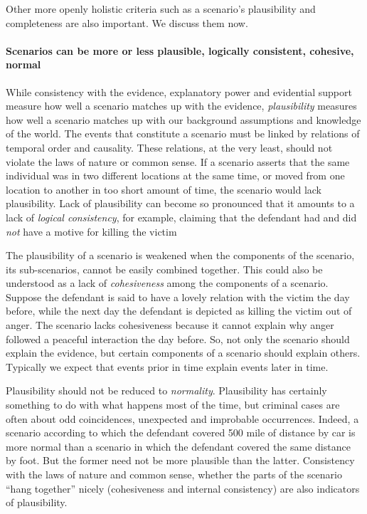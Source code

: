 \documentclass[10pt]{article}
\begin{document}
 
Other more openly holistic criteria such as a scenario's plausibility and completeness are also important. 
 We discuss them now.
  
\paragraph{Scenarios can be more or less plausible, logically consistent, cohesive, normal}

While consistency with the evidence, explanatory power and evidential support measure how well a 
scenario matches up with the evidence, \textit{plausibility} measures how well a scenario matches up with 
our background assumptions and knowledge of the world. The events that constitute a scenario must be linked 
by relations of temporal order and causality. These relations, at the very least, should not violate the laws of nature 
or common sense. If a scenario asserts that the same individual was in two different locations 
at the same time, or moved from one location to another in too short amount of time, the scenario would lack plausibility.  
Lack of plausibility can become so pronounced that it amounts to a lack of \textit{logical consistency}, for example, claiming that 
 the defendant had and did \textit{not} have a motive for killing the victim

The plausibility of a scenario is weakened when the components of the scenario, its
sub-scenarios, cannot be easily combined together. This could also be understood as 
a lack of \textit{cohesiveness} among the components of a scenario. Suppose the defendant is said to have a lovely relation with 
the victim the day before, while the next day the defendant is depicted as killing the victim out of anger.
The scenario lacks cohesiveness because it cannot explain why anger followed a peaceful 
interaction the day before. So, not only the scenario should explain the evidence, but certain
 components of a scenario should explain others. Typically we expect that events prior in time 
 explain events later in time. 
 
 Plausibility should not be reduced to \textit{normality}. Plausibility has certainly something to do with 
what happens most of the time, but criminal cases are often about odd coincidences, 
unexpected and improbable occurrences.  Indeed, a scenario according to which the defendant covered 500 mile of distance by car is more normal than a scenario in which the 
defendant covered the same distance by foot. But the former need not be more plausible than the latter. 
Consistency with the laws of nature and common sense, whether the parts 
of the scenario ``hang together'' nicely (cohesiveness and internal consistency) 
are also indicators of plausibility. 
\end{document}
